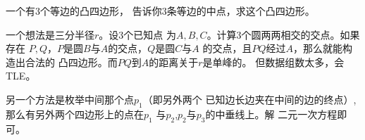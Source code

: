 \begin{prob}
	一个有$3$个等边的凸四边形，
	告诉你$3$条等边的中点，求这个凸四边形。
\end{prob}

\begin{sol}
	一个想法是三分半径$r$。设3个已知点
	为$A, B, C$。计算3个圆两两相交的交点。如果存在
	$P, Q$，$P$是圆$B$与$A$的交点，$Q$是圆$C$与$A$
	的交点，且$PQ$经过$A$，那么就能构造出合法的
	凸四边形。而$PQ$到$A$的距离关于$r$是单峰的。
	但数据组数太多，会TLE。\par
	另一个方法是枚举中间那个点$p_1$（即另外两个
	已知边长边夹在中间的边的终点）,
	那么有另外两个四边形上的点在$p_1$
	与$p_2$,$p_2$与$p_3$的中垂线上。解
	二元一次方程即可。
\end{sol}
